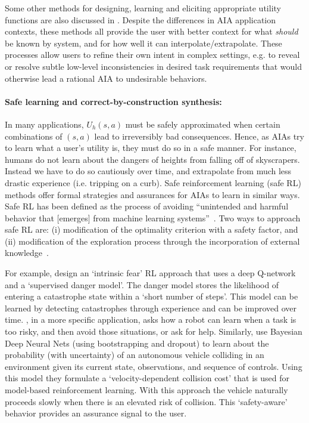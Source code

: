 Some other methods for designing, learning and eliciting appropriate utility functions are also discussed in \cite{Hadfield-Menell2016-ws,Da_Veiga2012-gh,Garcia2015-rs}.
Despite the differences in AIA application contexts, these methods all provide the user with better context for what \emph{should} be known by system, and for how well it can interpolate/extrapolate. 
These processes allow users to refine their own intent in complex settings, e.g. to reveal or resolve subtle low-level inconsistencies in desired task requirements that would otherwise lead a rational AIA to undesirable behaviors. 

\paragraph{Safe learning and correct-by-construction synthesis:}
In many applications, $U_h(s,a)$ must be safely approximated when certain combinations of $(s,a)$ lead to irreversibly bad consequences. 
Hence, as AIAs try to learn what a user's utility is, they must do so in a safe manner. 
For instance, humans do not learn about the dangers of heights from falling off of skyscrapers. 
Instead we have to do so cautiously over time, and extrapolate from much less drastic experience (i.e. tripping on a curb). 
Safe reinforcement learning (safe RL) methods offer formal strategies and assurances for AIAs to learn in similar ways.
Safe RL has been defined as the process of avoiding ``unintended and harmful behavior that [emerges] from machine learning systems''~\cite{Amodei2016-xi}. Two ways to approach safe RL are: (i) modification of the optimality criterion with a safety factor, and (ii) modification of the exploration process through the incorporation of external knowledge~\cite{Garcia2015-rs}. 

For example, \citet{Lipton2016-dq} design an `intrinsic fear' RL approach that uses a deep Q-network and a `supervised danger model'. The danger model stores the likelihood of entering a catastrophe state within a `short number of steps'. This model can be learned by detecting catastrophes through experience and can be improved over time. \citet{Curran2016-ij}, in a more specific application, asks how a robot can learn when a task is too risky, and then avoid those situations, or ask for help. 
Similarly, \citet{Kahn2017-vy} use Bayesian Deep Neural Nets (using bootstrapping and dropout) to learn about the probability (with uncertainty) of an autonomous vehicle colliding in an environment given its current state, observations, and sequence of controls. Using this model they formulate a `velocity-dependent collision cost' that is used for model-based reinforcement learning. With this approach the vehicle naturally proceeds slowly when there is an elevated risk of collision. This `safety-aware' behavior provides an assurance signal to the user. 

